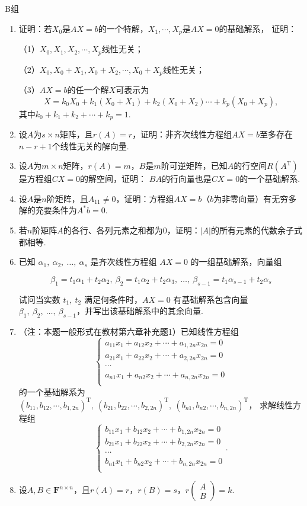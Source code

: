 \centerline{\heiti B组}
\begin{enumerate}
	\item 证明：若$X_0$是$AX=b$的一个特解，$X_1,\cdots,X_p$是$AX=0$的基础解系，
	证明：
	
	（1）$X_0,X_1,X_2,\cdots,X_p$线性无关；
	
	（2）$X_0,X_0+X_1,X_0+X_2,\cdots,X_0+X_p$线性无关；
	
	（3）$AX=b$的任一个解$X$可表示为
	$$X=k_0X_0+k_1(X_0+X_1)+k_2(X_0+X_2)\cdots+k_p(X_0+X_p),$$
	其中$k_0+k_1+k_2+\cdots+k_p=1$.
	\item 设$A$为$s \times n$矩阵，且$r(A)=r$，证明：非齐次线性方程组$AX=b$至多存在$n-r+1$个线性无关的解向量.
	\item 设$A$为$m \times n$矩阵，$r(A)=m$，$B$是$m$阶可逆矩阵，已知$A$的行空间$R(A^\mathrm{T})$是方程组$CX=0$的解空间，证明：
	$BA$的行向量也是$CX=0$的一个基础解系.
	\item 设$A$是$n$阶矩阵，且$A_{11}\neq 0$，证明：方程组$AX=b$（$b$为非零向量）有无穷多解的充要条件为$A^*b=0$.
	\item 若$n$阶矩阵$A$的各行、各列元素之和都为0，证明：$|A|$的所有元素的代数余子式都相等.
	\item 已知 $\alpha_1,\ \alpha_2,\ \dots,\ \alpha_s$ 是齐次线性方程组 $AX=0$ 的一组基础解系，向量组

	$$
	\beta_1=t_1\alpha_1+t_2\alpha_2,\ \beta_2=t_1\alpha_2+t_2\alpha_3,\ \dots,\ \beta_{s-1}=t_1\alpha_{s-1}+t_2\alpha_s
	$$
	
	试问当实数 $t_1,\ t_2$ 满足何条件时，$AX=0$ 有基础解系包含向量 $\beta_1,\ \beta_2,\ \dots,\ \beta_{s-1}$，并写出该基础解系中的其余向量.
	\item （注：本题一般形式在教材第六章补充题1）已知线性方程组$$\begin{cases}
		a_{11}x_1+a_{12}x_2+\cdots+a_{1,2n}x_{2n}=0 \\
		a_{21}x_1+a_{22}x_2+\cdots+a_{2,2n}x_{2n}=0 \\
		\cdots \\
		a_{n1}x_1+a_{n2}x_2+\cdots+a_{n,2n}x_{2n}=0 \\
	\end{cases}$$
	的一个基础解系为$(b_{11},b_{12},\cdots,b_{1,2n})^\mathrm{T},\ (b_{21},b_{22},\cdots,b_{2,2n})^\mathrm{T},\ (b_{n1},b_{n2},\cdots,b_{n,2n})^\mathrm{T}$，
	求解线性方程组$$\begin{cases}
		b_{11}x_1+b_{12}x_2+\cdots+b_{1,2n}x_{2n}=0 \\
		b_{21}x_1+b_{22}x_2+\cdots+b_{2,2n}x_{2n}=0 \\
		\cdots \\
		b_{n1}x_1+b_{n2}x_2+\cdots+b_{n,2n}x_{2n}=0 \\
	\end{cases}.$$
	\item 设$A,B\in \mathbf{F}^{n\times n}$，且$r(A)=r$，$r(B)=s$，$r\begin{pmatrix}
		A \\ B
	\end{pmatrix}=k$.


\end{enumerate}
